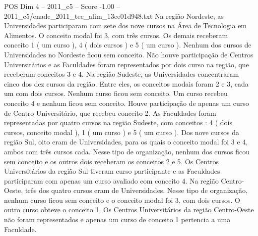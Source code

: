 \begin{textsample}{POS Dim 4 – 2011\_c5 – Score -1.00 – 2011\_c5/enade\_2011\_tec\_alim\_13ee01d948.txt}
Na região Nordeste, as Universidades participaram com sete dos nove cursos na Área de Tecnologia em Alimentos.
O conceito modal foi 3, com três cursos.
Os demais receberam conceito 1 ( um curso ), 4 ( dois cursos ) e 5 ( um curso ).
Nenhum dos cursos de Universidades no Nordeste ficou sem conceito.
Não houve participação de Centros Universitários e as Faculdades foram representados por dois curso na região, que receberam conceitos 3 e 4.
Na região Sudeste, as Universidades concentraram cinco dos dez cursos da região.
Entre eles, os conceitos modais foram 2 e 3, cada um com dois cursos.
Nenhum curso ficou sem conceito.
Um curso recebeu conceito 4 e nenhum ficou sem conceito.
Houve participação de apenas um curso de Centro Universitário, que recebeu conceito 2.
As Faculdades foram representadas por quatro cursos na região Sudeste, com conceitos : 4 ( dois cursos, conceito modal ), 1 ( um curso ) e 5 ( um curso ).
Dos nove cursos da região Sul, oito eram de Universidades, para os quais o conceito modal foi 3 e 4, ambos com três cursos cada.
Nesse tipo de organização, nenhum dos cursos ficou sem conceito e os outros dois receberam os conceitos 2 e 5.
Os Centros Universitários da região Sul tiveram curso participante e as Faculdades participaram com apenas um curso avaliado com conceito 4.
Na região Centro-Oeste, três dos quatro cursos eram de Universidades.
Nesse tipo de organização, nenhum curso ficou sem conceito e o conceito modal foi 3, com dois cursos.
O outro curso obteve o conceito 1.
Os Centros Universitários da região Centro-Oeste não foram representados e apenas um curso de conceito 1 pertencia a uma Faculdade.

\end{textsample}
